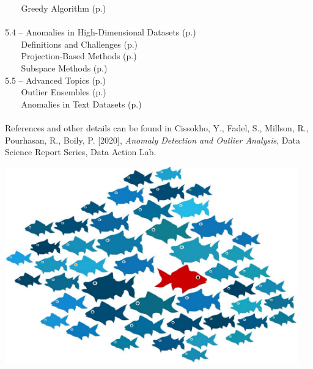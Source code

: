 \documentclass[20pt,landscape,footrule,headrule]{foils}
\newcommand{\localtextbulletone}{{\raisebox{.45ex}{\rule{.6ex}{.6ex}}}}
\begin{document}
\textcolor{white}{ab} \localtextbulletone\ Greedy Algorithm (p.\@\pageref{5.3.2}) 
\normalsize \ \\ \ \\ 
5.4 -- Anomalies in High-Dimensional Datasets (p.\pageref{5.4}) \\ 
\small
\textcolor{white}{ab} \localtextbulletone\ Definitions and Challenges (p.\@\pageref{5.4.1}) \\ 
\textcolor{white}{ab} \localtextbulletone\ Projection-Based Methods (p.\@\pageref{5.4.2}) \\ 
\textcolor{white}{ab} \localtextbulletone\ Subspace  Methods (p.\@\pageref{5.4.3}) 
\normalsize
\newpage\ \\ \noindent 
5.5 -- Advanced Topics (p.\pageref{5.5}) \\ 
\small
\textcolor{white}{ab} \localtextbulletone\ Outlier Ensembles (p.\@\pageref{5.5.1}) \\ 
\textcolor{white}{ab} \localtextbulletone\ Anomalies in Text Datasets (p.\@\pageref{5.5.2})\normalsize 
 \ \\ \ \\ 
References and other details can be found in Cissokho, Y., Fadel, S., Millson, R., Pourhasan, R., Boily, P. [2020], \textit{Anomaly Detection and Outlier Analysis}, Data Science Report Series, Data Action Lab.


\newpage
\begin{center}
\includegraphics[width=0.95\textwidth]{Images/fish.png}
\end{center}
\end{document}
